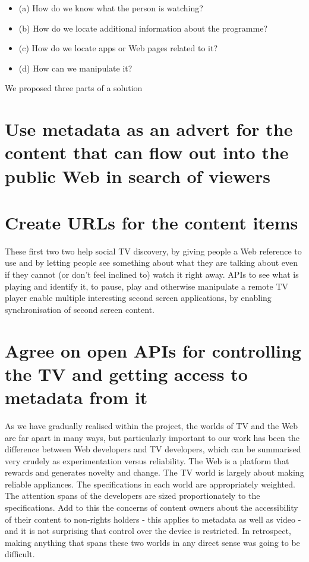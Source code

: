 \documentclass{notube}
\begin{document}
\begin{itemize}
\item{(a) How do we know what the person is watching?}
\item{(b) How do we locate additional information about the programme?}
\item{(c) How do we locate apps or Web pages related to it?}
\item{(d) How can we manipulate it?}
\end{itemize}

We proposed three parts of a solution


\section{Use metadata as an advert for the content that can flow out into the public Web in search of viewers}
\section{Create URLs for the content items}

These first two two help social TV discovery, by giving people a Web reference to use and by letting people see something about what they are talking about even if they cannot (or don't feel inclined to) watch it right away.  APIs to see what is playing and identify it, to pause, play and otherwise manipulate a remote TV player enable multiple interesting second screen applications, by enabling synchronisation of second screen content.

\section{Agree on open APIs for controlling the TV and getting access to metadata from it}

As we have gradually realised within the project, the worlds of TV and the Web are far apart in many ways, but particularly important to our work has been the difference between Web developers and TV developers, which can be summarised very crudely as experimentation versus reliability. The Web is a platform that rewards and generates novelty and change. The TV world is largely about making reliable appliances. The specifications in each world are appropriately weighted. The attention spans of the developers are sized proportionately to the specifications. Add to this the concerns of content owners about the accessibility of   their content to non-rights holders - this applies to metadata as well as video - and it is not surprising that control over the device is restricted. In retrospect, making anything that spans these two worlds in any direct sense was going to be difficult.
\\
\end{document}
